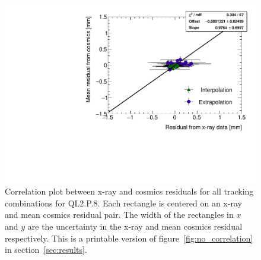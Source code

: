 \begin{figure}
    \centering
    \includegraphics[width = \textwidth]{figures/figure_QL2P08_3100V_2021-08-16_QL2P08_local_cosmic_and_xray_data_correlation_plot_printable.pdf}
    \caption{Correlation plot between x-ray and cosmics residuals for all tracking combinations for QL2.P.8. Each rectangle is centered on an x-ray and mean cosmics residual pair. The width of the rectangles in $x$ and $y$ are the uncertainty in the x-ray and mean cosmics residual respectively. This is a printable version of figure~\ref{fig:no_correlation} in section~\ref{sec:results}.}
    \label{fig:no_correlation_print}
\end{figure}
